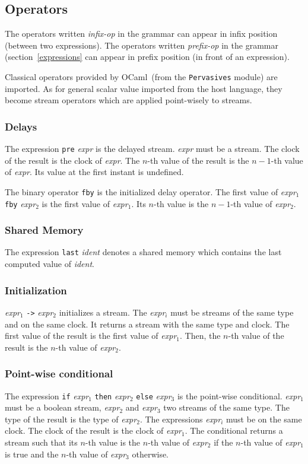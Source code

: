 \documentclass[11pt,titlepage,twoside]{report}
\newcommand{\ocaml}{{\sf OCaml}}
\newcommand{\If}{\mbox{{\tt if}}}
\newcommand{\Then}{\mbox{{\tt then}}}
\newcommand{\Else}{\mbox{{\tt else}}}
\newcommand{\Pre}{\mbox{{\tt pre}}}
\newcommand{\Last}{\mbox{{\tt last}}}
\newcommand{\Fby}{\mbox{{\tt fby}}}
\newcommand{\Minusgreater}{\mbox{{\tt ->}}}
\newcommand{\term}[1]{{\tt #1}}
\newcommand{\nterm}[1]{{\em #1}}
\begin{document}
\subsection{Operators}
The operators written \nterm{infix-op} in the grammar can appear in
infix position (between two expressions). The operators written
\nterm{prefix-op} in the grammar (section~\ref{expressions} can appear
in prefix position (in front of an expression).

Classical operators provided by \ocaml\ (from the {\tt Pervasives}
module) are imported. As for general scalar value imported from the
host language, they become stream operators which are applied
point-wisely to streams.

\subsubsection{Delays}
The expression \term{\Pre} \nterm{expr} is the delayed
stream. \nterm{expr} must be a stream. The clock of the result is the
clock of \nterm{expr}. The $n$-th value of the result is the $n-1$-th
value of \nterm{expr}. Its value at the first instant is undefined.

The binary operator \term{\Fby} is the initialized delay operator. The
first value of \nterm{expr}$_1$ \term{\Fby} \nterm{expr}$_2$ is the
first value of \nterm{expr}$_1$. Its $n$-th value is the $n-1$-th
value of \nterm{expr}$_2$.

\subsubsection{Shared Memory}
The expression \term{\Last} \nterm{ident} denotes a shared memory
which contains the last computed value of \nterm{ident}.

\subsubsection{Initialization}
\nterm{expr}$_1$ \term{\Minusgreater} \nterm{expr}$_2$ initializes a
stream. The \nterm{expr}$_i$ must be streams of the same type and on
the same clock. It returns a stream with the same type and clock. The
first value of the result is the first value of
\nterm{expr}$_1$. Then, the $n$-th value of the result is the $n$-th
value of \nterm{expr}$_2$.

\subsubsection{Point-wise conditional}
The expression \term{\If} \nterm{expr}$_1$ \term{\Then}
\nterm{expr}$_2$ \term{\Else} \nterm{expr}$_3$ is the point-wise
conditional. \nterm{expr}$_1$ must be a boolean stream,
\nterm{expr}$_2$ and \nterm{expr}$_3$ two streams of the same
type. The type of the result is the type of \nterm{expr}$_2$. The
expressions \nterm{expr}$_i$ must be on the same clock. The clock of
the result is the clock of \nterm{expr}$_1$. The conditional returns a
stream such that its $n$-th value is the $n$-th value of
\nterm{expr}$_2$ if the $n$-th value of \nterm{expr}$_1$ is true and
the $n$-th value of \nterm{expr}$_3$ otherwise.
\end{document}
